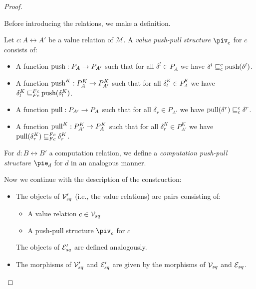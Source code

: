\begin{proof}
\begin{itemize}
    \end{itemize}

    Before introducing the relations, we make a definition.

    \begin{definition}
      Let $c : A \rel A'$ be a value relation of $\mathcal M$. A \emph{value push-pull structure} $\piv_c$ for $c$ consists of:
      \begin{itemize}
        \item A function $\text{push} : P_A \to P_{A'}$ 
              such that for all $\delta^l \in P_A$ we have $\delta^l \sqsubseteq_c^c \text{push}(\delta^l)$.
        \item A function $\text{push}^K : P^K_A \to P^K_{A'}$ 
              such that for all $\delta^K_l \in P^K_A$ we have $\delta^K_l \sqsubseteq_{Fc}^{Fc} \text{push}(\delta^K_l)$.
        \item A function $\text{pull} : P_{A'} \to P_A$
              such that for all $\delta_r \in P_{A'}$ we have $\text{pull}(\delta^r) \sqsubseteq_{c}^c \delta^r$.
        \item A function $\text{pull}^K : P^K_{A'} \to P^K_A$
              such that for all $\delta^K_r \in P^K_{A'}$ we have $\text{pull}(\delta^K_r) \sqsubseteq_{Fc}^{Fc} \delta^K_r$.
      \end{itemize}

      For $d : B \rel B'$ a computation relation, we define a \emph{computation push-pull structure} $\pie_d$ for $d$
      in an analogous manner.
    \end{definition}


    Now we continue with the description of the construction:
    \begin{itemize}

      \item The objects of $\mathcal{V}_{sq}'$ (i.e., the value relations) are pairs consisting of:
      \begin{itemize}
        \item A value relation $c \in \mathcal{V}_{sq}$
        \item A push-pull structure $\piv_c$ for $c$
      \end{itemize}

      The objects of $\mathcal{E}_{sq}'$ are defined analogously.
            
      \item The morphisms of $\mathcal{V}_{sq}'$ and $\mathcal{E}_{sq}'$ are given by the morphisms of $\mathcal{V}_{sq}$ and $\mathcal{E}_{sq}$.
      
     

\end{itemize}
\end{proof}
